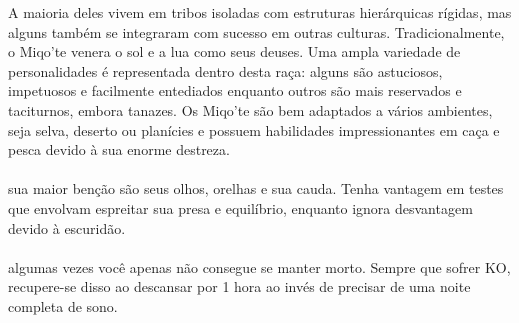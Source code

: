 A maioria deles vivem em tribos isoladas com estruturas hierárquicas rígidas, mas alguns também se integraram com sucesso em outras culturas.
Tradicionalmente, o Miqo'te venera o sol e a lua como seus deuses.
Uma ampla variedade de personalidades é representada dentro desta raça: alguns são astuciosos, impetuosos e facilmente entediados enquanto outros são mais reservados e taciturnos, embora tanazes. 
Os Miqo'te são bem adaptados a vários ambientes, seja selva, deserto ou planícies e possuem habilidades impressionantes em caça e pesca devido à sua enorme destreza.
\\\\
 sua maior benção são seus olhos, orelhas e sua cauda.
Tenha vantagem em testes que envolvam espreitar sua presa e equilíbrio, enquanto ignora desvantagem devido à escuridão.
\\\\
 algumas vezes você apenas não consegue se manter morto.
Sempre que sofrer KO, recupere-se disso ao descansar por 1 hora ao invés de precisar de uma noite completa de sono.
%
%
\clearpage

